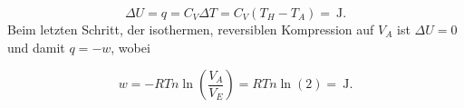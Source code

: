       \begin{equation}
        \Delta U = q = C_V \Delta T = C_V \left(T_H - T_A\right) = \SI[mode=text]{}{\joule}.
      \end{equation}
    Beim letzten Schritt, der isothermen, reversiblen Kompression auf $V_A$ ist $\Delta U = 0$ und damit $q = -w$, wobei
    
    
    \begin{equation}
      w = -RTn \ln\left(\frac{V_A}{V_E}\right) = RTn \ln(2) = \SI[mode=text]{}{\joule}.
    \end{equation}
    
  
      
  
    